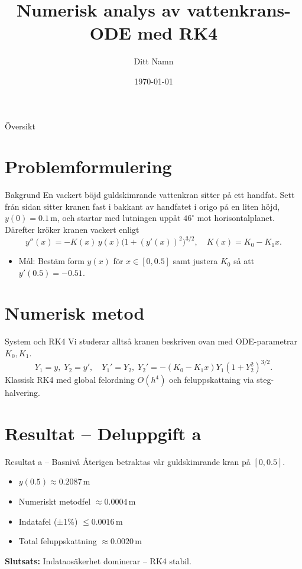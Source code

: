 \documentclass{beamer}
\title{Numerisk analys av vattenkrans-ODE med RK4}
\author{Ditt Namn}
\date{\today}
\begin{document}
\maketitle

\begin{frame}{Översikt}
  \tableofcontents
\end{frame}

\section{Problemformulering}
\begin{frame}{Bakgrund}
  \small En vackert böjd guldskimrande vattenkran sitter på ett handfat. Sett från sidan sitter kranen fast i bakkant av handfatet i origo på en liten höjd, $y(0)=0.1$\,m, och startar med lutningen uppåt $46^\circ$ mot horisontalplanet. Därefter kröker kranen vackert enligt
  \[ y''(x) = -K(x)\,y(x)\bigl(1 + (y'(x))^2\bigr)^{3/2}, \quad K(x)=K_0-K_1 x. \]
  \vspace{1em}
  \begin{itemize}
    \item Mål: Bestäm form $y(x)$ för $x\in[0,0.5]$ samt justera $K_0$ så att $y'(0.5)=-0.51$.
  \end{itemize}
\end{frame}

\section{Numerisk metod}
\begin{frame}{System och RK4}
  \small Vi studerar alltså kranen beskriven ovan med ODE-parametrar $K_0, K_1$.\
  \[
    Y_1=y,\;Y_2=y',\quad
    Y_1'=Y_2,\;Y_2'=-(K_0-K_1x)Y_1(1+Y_2^2)^{3/2}.
  \]
  Klassisk RK4 med global felordning $O(h^4)$ och feluppskattning via steg-halvering.
\end{frame}

\section{Resultat – Deluppgift a}
\begin{frame}{Resultat a – Basnivå}
  \small Återigen betraktas vår guldskimrande kran på $[0,0.5]$.\
  \begin{itemize}
    \item $y(0.5)\approx0.2087$\,m
    \item Numeriskt metodfel $\approx0.0004$\,m
    \item Indatafel (±1\%) $\le0.0016$\,m
    \item Total feluppskattning $\approx0.0020$\,m
  \end{itemize}
  \textbf{Slutsats:} Indataosäkerhet dominerar – RK4 stabil.
\end{frame}
\end{document}

